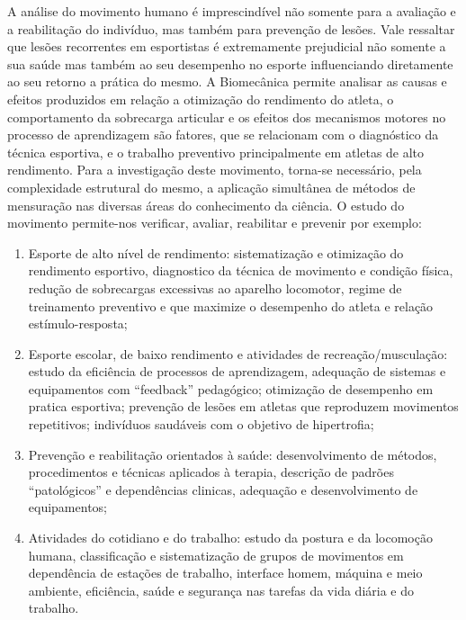A análise do movimento humano é imprescindível não somente para a avaliação e a
reabilitação do indivíduo, mas também para prevenção de lesões. Vale ressaltar que
lesões recorrentes em esportistas é extremamente prejudicial não somente a sua saúde
mas também ao seu desempenho no esporte influenciando diretamente ao seu retorno a
prática do mesmo. A Biomecânica  permite analisar as causas e efeitos
produzidos em relação a otimização do rendimento do atleta, o comportamento da
sobrecarga articular e os efeitos dos mecanismos motores no processo de aprendizagem
são fatores, que se relacionam com o diagnóstico da técnica esportiva, e o trabalho
preventivo principalmente em atletas de alto rendimento. Para a investigação deste
movimento, torna-se necessário, pela complexidade estrutural do mesmo, a aplicação
simultânea de métodos de mensuração nas diversas áreas do conhecimento da ciência. O
estudo do movimento permite-nos verificar, avaliar, reabilitar e prevenir por exemplo:
  \begin{enumerate}
  \item Esporte de alto nível de rendimento: sistematização e otimização do rendimento
  esportivo, diagnostico da técnica de movimento e condição física, redução de
  sobrecargas excessivas ao aparelho locomotor, regime de treinamento preventivo e que
  maximize o desempenho do atleta e relação estímulo-resposta;
  \item Esporte escolar, de baixo rendimento e atividades de recreação/musculação: estudo
  da eficiência de processos de aprendizagem, adequação de sistemas e equipamentos
  com “feedback” pedagógico; otimização de desempenho em pratica esportiva;
  prevenção de lesões em atletas que reproduzem movimentos repetitivos; indivíduos
  saudáveis com o objetivo de hipertrofia;
  \item Prevenção e reabilitação orientados à saúde: desenvolvimento de métodos,
  procedimentos e técnicas aplicados à terapia, descrição de padrões “patológicos” e
  dependências clinicas, adequação e desenvolvimento de equipamentos;
  \item Atividades do cotidiano e do trabalho: estudo da postura e da locomoção humana,
  classificação e sistematização de grupos de movimentos em dependência de estações de
  trabalho, interface homem, máquina e meio ambiente, eficiência, saúde e segurança nas
  tarefas da vida diária e do trabalho.
  \end{enumerate}
\cite{contextBiomecanica}
